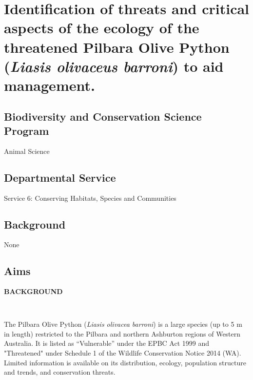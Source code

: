 \documentclass[version=last,
    paper=a4,                               %
    10pt,                                   %
    dvipsnames,
    oneside,                              %
    headings=openany,                       %
    open=any,
    BCOR=7mm,                               %
    DIV=15,     %
]{scrbook}
\begin{document}
\section*{Identification of threats and critical aspects of the ecology of the
threatened Pilbara Olive Python (\emph{Liasis olivaceus barroni}) to aid
management.
}



\subsection*{Biodiversity and Conservation Science Program}

Animal Science




\subsection*{Departmental Service}

Service 6: Conserving Habitats, Species and Communities





\subsection*{Background}

None




\subsection*{Aims}

\textbf{BACKGROUND}

~

The Pilbara Olive Python (\emph{Liasis olivacea barroni}) is a large
species (up to 5 m in length) restricted to the Pilbara and northern
Ashburton regions of Western Australia. It is listed as ``Vulnerable''
under the EPBC Act 1999 and "Threatened" under Schedule 1 of the
Wildlife Conservation Notice 2014 (WA). Limited information is available
on its distribution, ecology, population structure and trends, and
conservation threats.~
\end{document}
